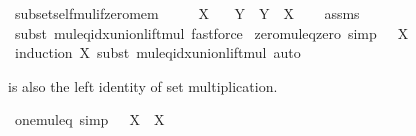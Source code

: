 \begin{isabellebody}
{\isafoldproof}%
%
\isadelimproof
\isanewline
%
\endisadelimproof
\isanewline
{}\isamarkupfalse%
\ subset{\isacharunderscore}{\kern0pt}self{\isacharunderscore}{\kern0pt}mul{\isacharunderscore}{\kern0pt}if{\isacharunderscore}{\kern0pt}zero{\isacharunderscore}{\kern0pt}mem{\isacharcolon}{\kern0pt}\isanewline
\ \ \ {\isachardoublequoteopen}{}\ {\isasymin}\ X{\isachardoublequoteclose}\isanewline
\ \ \ {\isachardoublequoteopen}Y\ {\isasymsubseteq}\ Y\ {\isacharasterisk}{\kern0pt}\ X{\isachardoublequoteclose}\isanewline
%
\isadelimproof
\ \ %
\endisadelimproof
%
\isatagproof
{}\isamarkupfalse%
\ assms\ \isamarkupfalse%
\ {\isacharparenleft}{\kern0pt}subst\ mul{\isacharunderscore}{\kern0pt}eq{\isacharunderscore}{\kern0pt}idx{\isacharunderscore}{\kern0pt}union{\isacharunderscore}{\kern0pt}lift{\isacharunderscore}{\kern0pt}mul{\isacharparenright}{\kern0pt}\ fastforce%
\endisatagproof
{\isafoldproof}%
%
\isadelimproof
%
\endisadelimproof
%
\isadelimdocument
%
\endisadelimdocument
%
\isatagdocument
%
\isamarkuptrue%
%
\endisatagdocument
{\isafolddocument}%
%
\isadelimdocument
%
\endisadelimdocument
{}\isamarkupfalse%
\ zero{\isacharunderscore}{\kern0pt}mul{\isacharunderscore}{\kern0pt}eq{\isacharunderscore}{\kern0pt}zero\ {\isacharbrackleft}{\kern0pt}simp{\isacharbrackright}{\kern0pt}{\isacharcolon}{\kern0pt}\ {\isachardoublequoteopen}{}\ {\isacharasterisk}{\kern0pt}\ X\ {\isacharequal}{\kern0pt}\ {}{\isachardoublequoteclose}\isanewline
%
\isadelimproof
\ \ %
\endisadelimproof
%
\isatagproof
{}\isamarkupfalse%
\ {\isacharparenleft}{\kern0pt}induction\ X{\isacharcomma}{\kern0pt}\ subst\ mul{\isacharunderscore}{\kern0pt}eq{\isacharunderscore}{\kern0pt}idx{\isacharunderscore}{\kern0pt}union{\isacharunderscore}{\kern0pt}lift{\isacharunderscore}{\kern0pt}mul{\isacharparenright}{\kern0pt}\ auto%
\endisatagproof
{\isafoldproof}%
%
\isadelimproof
%
\endisadelimproof
%
\begin{isamarkuptext}%
 is also the left identity of set multiplication.%
\end{isamarkuptext}\isamarkuptrue%
\isamarkupfalse%
\ one{\isacharunderscore}{\kern0pt}mul{\isacharunderscore}{\kern0pt}eq\ {\isacharbrackleft}{\kern0pt}simp{\isacharbrackright}{\kern0pt}{\isacharcolon}{\kern0pt}\ {\isachardoublequoteopen}{}\ {\isacharasterisk}{\kern0pt}\ X\ {\isacharequal}{\kern0pt}\ X{\isachardoublequoteclose}\isanewline

\end{isabellebody}
